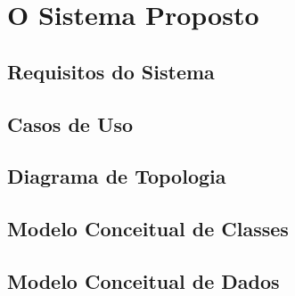 \documentclass[a4paper]{abntex2}
\begin{document}
\chapter{O Sistema Proposto}

\section{Requisitos do Sistema}

\pagebreak
\section{Casos de Uso}

\section{Diagrama de Topologia}

\section{Modelo Conceitual de Classes}

\section{Modelo Conceitual de Dados}

\printbibliography
\end{document}
